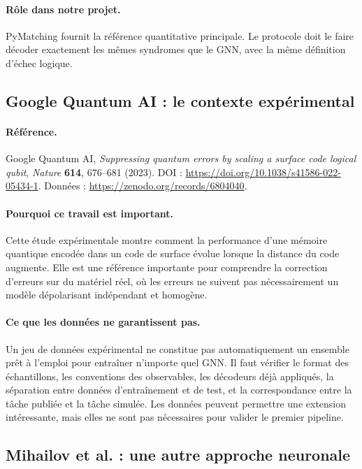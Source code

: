 \documentclass[11pt,a4paper]{article}
\begin{document}
\paragraph{Rôle dans notre projet.}
PyMatching fournit la référence quantitative principale. Le protocole doit
le faire décoder exactement les mêmes syndromes que le GNN, avec la même
définition d'échec logique.

\subsection{Google Quantum AI : le contexte expérimental}

\paragraph{Référence.}
Google Quantum AI, \emph{Suppressing quantum errors by scaling a surface
code logical qubit}, \emph{Nature} \textbf{614}, 676--681 (2023).
DOI : \url{https://doi.org/10.1038/s41586-022-05434-1}.
Données : \url{https://zenodo.org/records/6804040}.

\paragraph{Pourquoi ce travail est important.}
Cette étude expérimentale montre comment la performance d'une mémoire
quantique encodée dans un code de surface évolue lorsque la distance du code
augmente. Elle est une référence importante pour comprendre la correction
d'erreurs sur du matériel réel, où les erreurs ne suivent pas nécessairement
un modèle dépolarisant indépendant et homogène.

\paragraph{Ce que les données ne garantissent pas.}
Un jeu de données expérimental ne constitue pas automatiquement un ensemble
prêt à l'emploi pour entraîner n'importe quel GNN. Il faut vérifier le
format des échantillons, les conventions des observables, les décodeurs
déjà appliqués, la séparation entre données d'entraînement et de test, et
la correspondance entre la tâche publiée et la tâche simulée. Les données
peuvent permettre une extension intéressante, mais elles ne sont pas
nécessaires pour valider le premier pipeline.

\subsection{Mihailov et al. : une autre approche neuronale}
\end{document}
